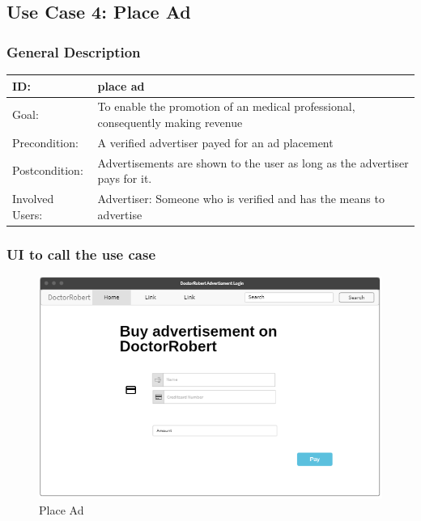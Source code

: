 \subsection{Use Case 4: Place Ad}

\subsubsection{General Description}

\begin{tabular}{|p{.2\linewidth}|p{.65\linewidth}|}
\hline 
ID: & place ad \\ \hline
Goal: & To enable the promotion of an medical professional, consequently making revenue \\ \hline
Precondition: & A verified advertiser payed for an ad placement \\ \hline
Postcondition: & Advertisements are shown to the user as long as the advertiser pays for it. \\ \hline
Involved Users: & Advertiser: Someone who is verified and has the means to advertise \\ \hline
\end{tabular}

\subsubsection{UI to call the use case}

\begin{center}
\begin{figure}[H]
\centering
\includegraphics[scale=0.8]{SystemSpec/Usecases/Mocks/placead01.PNG}
\caption{\label{fig:blue_rectangle}Place Ad}
\end{figure}
\end{center}

